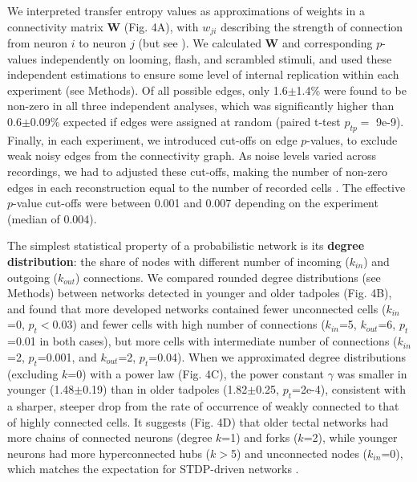 \documentclass{article}
\begin{document}
We interpreted transfer entropy values as approximations of weights in a connectivity matrix $\textbf{W}$ (Fig. 4A), with $w_{ji}$ describing the strength of connection from neuron $i$ to neuron $j$ (but see \citealt{mehler2018lure}). We calculated $\textbf{W}$ and corresponding $p$-values independently on looming, flash, and scrambled stimuli, and used these independent estimations to ensure some level of internal replication within each experiment (see Methods). Of all possible edges, only 1.6$\pm$1.4\% were found to be non-zero in all three independent analyses, which was significantly higher than 0.6$\pm$0.09\% expected if edges were assigned at random (paired t-test $p_{tp}=$ 9e-9). Finally, in each experiment, we introduced cut-offs on edge $p$-values, to exclude weak noisy edges from the connectivity graph. As noise levels varied across recordings, we had to adjusted these cut-offs, making the number of non-zero edges in each reconstruction equal to the number of recorded cells \citep{stetter2012te}. The effective $p$-value cut-offs were between 0.001 and 0.007 depending on the experiment (median of 0.004).

The simplest statistical property of a probabilistic network is its \textbf{degree distribution}: the share of nodes with different number of incoming ($k_{in}$) and outgoing ($k_{out}$) connections. We compared rounded degree distributions (see Methods) between networks detected in younger and older tadpoles (Fig. 4B), and found that more developed networks contained fewer unconnected cells ($k_{in}$=0, $p_t<$0.03) and fewer cells with high number of connections ($k_{in}$=5, $k_{out}$=6, $p_t$=0.01 in both cases), but more cells with intermediate number of connections ($k_{in}$=2, $p_t$=0.001, and $k_{out}$=2, $p_t$=0.04). When we approximated degree distributions (excluding $k$=0) with a power law (Fig. 4C), the power constant $\gamma$ was smaller in younger (1.48$\pm$0.19) than in older tadpoles (1.82$\pm$0.25, $p_t$=2e-4), consistent with a sharper, steeper drop from the rate of occurrence of weakly connected to that of highly connected cells. It suggests (Fig. 4D) that older tectal networks had more chains of connected neurons (degree $k$=1) and forks ($k$=2), while younger neurons had more hyperconnected hubs ($k>$5) and unconnected nodes ($k_{in}$=0), which matches the expectation for STDP-driven networks \citep{fiete2010chains}.
\end{document}

